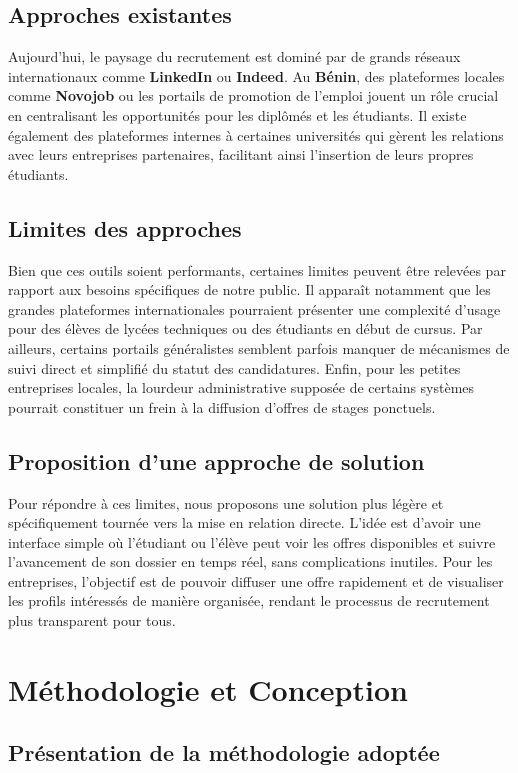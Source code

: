 \documentclass[12pt,a4paper,oneside]{memoir}
\begin{document}
	\section{Approches existantes}
	Aujourd'hui, le paysage du recrutement est dominé par de grands réseaux internationaux comme \textbf{LinkedIn} ou \textbf{Indeed}. Au \textbf{Bénin}, des plateformes locales comme \textbf{Novojob} ou les portails de promotion de l'emploi jouent un rôle crucial en centralisant les opportunités pour les diplômés et les étudiants. Il existe également des plateformes internes à certaines universités qui gèrent les relations avec leurs entreprises partenaires, facilitant ainsi l'insertion de leurs propres étudiants.

	\section{Limites des approches}
	Bien que ces outils soient performants, certaines limites peuvent être relevées par rapport aux besoins spécifiques de notre public. Il apparaît notamment que les grandes plateformes internationales pourraient présenter une complexité d'usage pour des élèves de lycées techniques ou des étudiants en début de cursus. Par ailleurs, certains portails généralistes semblent parfois manquer de mécanismes de suivi direct et simplifié du statut des candidatures. Enfin, pour les petites entreprises locales, la lourdeur administrative supposée de certains systèmes pourrait constituer un frein à la diffusion d'offres de stages ponctuels.

	\section{Proposition d’une approche de solution}
	Pour répondre à ces limites, nous proposons une solution plus légère et spécifiquement tournée vers la mise en relation directe. L'idée est d'avoir une interface simple où l'étudiant ou l'élève peut voir les offres disponibles et suivre l'avancement de son dossier en temps réel, sans complications inutiles. Pour les entreprises, l'objectif est de pouvoir diffuser une offre rapidement et de visualiser les profils intéressés de manière organisée, rendant le processus de recrutement plus transparent pour tous.
	
	\chapter{Méthodologie et Conception}
	\section{Présentation de la méthodologie adoptée}
\end{document}
